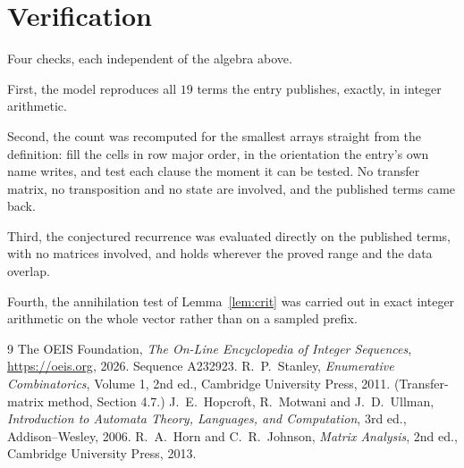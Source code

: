\documentclass[11pt,a4paper]{article}
\theoremstyle{plain}
\theoremstyle{definition}
\begin{document}
\section{Verification}

Four checks, each independent of the algebra above.

First, the model reproduces all $19$ terms the entry publishes, exactly, in integer
arithmetic.

Second, the count was recomputed for the smallest arrays straight from the definition: fill the
cells in row major order, in the orientation the entry's own name writes, and test each clause
the moment it can be tested. No transfer matrix, no transposition and no state are involved,
and the published terms came back.

Third, the conjectured recurrence was evaluated directly on the published terms, with no
matrices involved, and holds wherever the proved range and the data overlap.

Fourth, the annihilation test of Lemma~\ref{lem:crit} was carried out in exact integer
arithmetic on the whole vector rather than on a sampled prefix.

\begin{thebibliography}{9}
 The OEIS Foundation, \emph{The On-Line Encyclopedia of Integer
Sequences}, \url{https://oeis.org}, 2026. Sequence A232923.
 R.~P.~Stanley, \emph{Enumerative Combinatorics}, Volume 1, 2nd ed.,
Cambridge University Press, 2011. (Transfer-matrix method, Section 4.7.)
 J.~E.~Hopcroft, R.~Motwani and J.~D.~Ullman, \emph{Introduction to Automata
Theory, Languages, and Computation}, 3rd ed., Addison--Wesley, 2006.
 R.~A.~Horn and C.~R.~Johnson, \emph{Matrix Analysis}, 2nd ed., Cambridge
University Press, 2013.
\end{thebibliography}
\end{document}
